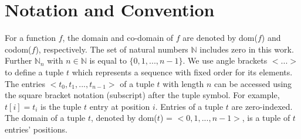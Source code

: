 \section{Notation and Convention}
\label{sec:notation}

For a function $f$, the domain and co-domain of $f$ are denoted by dom($f$) and codom($f$), respectively. The set of natural numbers $\mathbb{N}$ includes zero in this work. Further $\mathbb{N}_{n}$ with $n \in \mathbb{N}$ is equal to $\{0, 1, ..., n -1\}$.
We use angle brackets $<...>$ to define a tuple $t$ which represents a sequence with fixed order for its elements. The entries $<t_0, t_1, ... , t_{n-1}>$ of a tuple $t$ with length $n$ can be accessed using the square bracket notation (subscript) after the tuple symbol. 
For example, $t[i]=t_i$ is the tuple $t$ entry at position $i$. 
Entries of a tuple $t$ are zero-indexed. 
The domain of a tuple $t$, denoted by dom($t$) = $<0,1,...,n-1>$, is a tuple of $t$ entries' positions.

